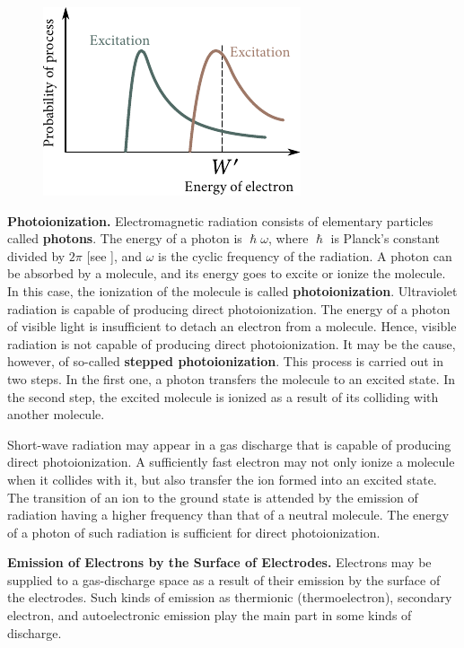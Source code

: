 \begin{figure}[t]
	\begin{center}
		\includegraphics[scale=1]{figures/ch_12/fig_12_6.pdf}
		\caption[]{}
		\label{fig:12_6}
	\end{center}
	\vspace{-0.8cm}
\end{figure}

\textbf{Photoionization.} Electromagnetic radiation consists of elementary particles called \textbf{photons}.
The energy of a photon is $\hslash\omega$, where $\hslash$ is Planck's constant divided by $2\pi$ [see ], and $\omega$ is the cyclic frequency of the radiation.
A photon can be absorbed by a molecule, and its energy goes to excite or ionize the molecule.
In this case, the ionization of the molecule is called \textbf{photoionization}.
Ultraviolet radiation is capable of producing direct photoionization.
The energy of a photon of visible light is insufficient to detach an electron from a molecule.
Hence, visible radiation is not capable of producing direct photoionization.
It may be the cause, however, of so-called \textbf{stepped photoionization}.
This process is carried out in two steps.
In the first one, a photon transfers the molecule to
an excited state.
In the second step, the excited molecule is ionized as a result of its colliding with another molecule.

Short-wave radiation may appear in a gas discharge that is capable of producing direct photoionization.
A sufficiently fast electron may not only ionize a molecule when it collides with it, but also transfer the ion formed into an excited state.
The transition of an ion to the ground state is attended by the emission of radiation having a higher frequency than that of a neutral molecule.
The energy of a photon of such radiation is sufficient for direct photoionization.

\textbf{Emission of Electrons by the Surface of Electrodes.} Electrons may be supplied to a gas-discharge space as a result of their emission by the surface of the electrodes.
Such kinds of emission as thermionic (thermoelectron), secondary electron, and autoelectronic emission play the main part in some kinds of discharge.

